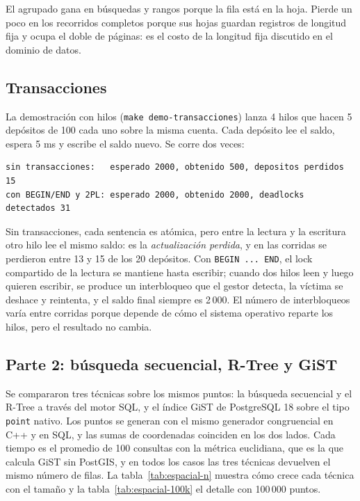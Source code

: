 \documentclass[11pt,a4paper]{article}
\begin{document}
El agrupado gana en búsquedas y rangos porque la fila está en la hoja. Pierde un poco en los recorridos completos porque sus hojas guardan registros de longitud fija y ocupa el doble de páginas: es el costo de la longitud fija discutido en el dominio de datos.

\subsection{Transacciones}
\label{sec:demo}

La demostración con hilos (\texttt{make demo-transacciones}) lanza 4 hilos que hacen 5 depósitos de 100 cada uno sobre la misma cuenta. Cada depósito lee el saldo, espera 5 ms y escribe el saldo nuevo. Se corre dos veces:

\begin{lstlisting}
sin transacciones:   esperado 2000, obtenido 500, depositos perdidos 15
con BEGIN/END y 2PL: esperado 2000, obtenido 2000, deadlocks detectados 31
\end{lstlisting}

Sin transacciones, cada sentencia es atómica, pero entre la lectura y la escritura otro hilo lee el mismo saldo: es la \emph{actualización perdida}, y en las corridas se perdieron entre 13 y 15 de los 20 depósitos. Con \texttt{BEGIN ... END}, el lock compartido de la lectura se mantiene hasta escribir; cuando dos hilos leen y luego quieren escribir, se produce un interbloqueo que el gestor detecta, la víctima se deshace y reintenta, y el saldo final siempre es 2\,000. El número de interbloqueos varía entre corridas porque depende de cómo el sistema operativo reparte los hilos, pero el resultado no cambia.

\subsection{Parte 2: búsqueda secuencial, R-Tree y GiST}

Se compararon tres técnicas sobre los mismos puntos: la búsqueda secuencial y el R-Tree a través del motor SQL, y el índice GiST de PostgreSQL 18 sobre el tipo \texttt{point} nativo. Los puntos se generan con el mismo generador congruencial en C++ y en SQL, y las sumas de coordenadas coinciden en los dos lados. Cada tiempo es el promedio de 100 consultas con la métrica euclidiana, que es la que calcula GiST sin PostGIS, y en todos los casos las tres técnicas devuelven el mismo número de filas. La tabla~\ref{tab:espacial-n} muestra cómo crece cada técnica con el tamaño y la tabla~\ref{tab:espacial-100k} el detalle con 100\,000 puntos.
\end{document}
